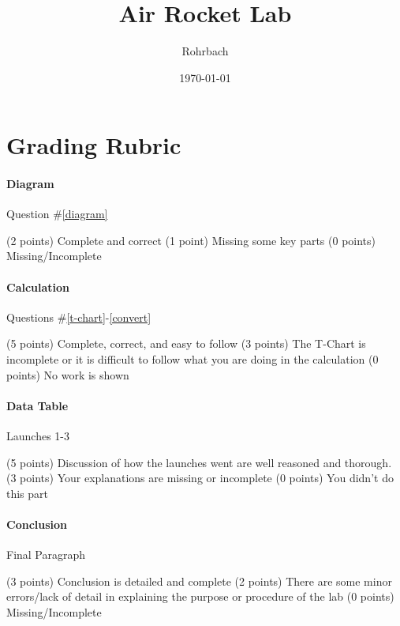 \documentclass[10pt]{exam}
\title{Air Rocket Lab}
\author{Rohrbach}
\date{\today}
\begin{document}
\maketitle


\section*{Grading Rubric}

  \paragraph{Diagram} Question \#\ref{diagram}
  \vspace{0.5em}
  \begin{checkboxes} \small
    \choice (2 points) Complete and correct 
    \choice (1 point) Missing some key parts
    \choice (0 points) Missing/Incomplete
  \end{checkboxes}


  \paragraph{Calculation} Questions \#\ref{t-chart}-\ref{convert}
  \vspace{0.5em}
  \begin{checkboxes} \small
    \choice (5 points) Complete, correct, and easy to follow 
    \choice (3 points) The T-Chart is incomplete or it is difficult to follow what you are doing in the calculation
    \choice (0 points) No work is shown
  \end{checkboxes}


  \paragraph{Data Table} Launches 1-3
  \vspace{0.5em}
  \begin{checkboxes} \small
    \choice (5 points) Discussion of how the launches went are well reasoned and thorough.
    \choice (3 points) Your explanations are missing or incomplete
    \choice (0 points) You didn't do this part
  \end{checkboxes}

  \paragraph{Conclusion} Final Paragraph
  \vspace{0.5em}
  \begin{checkboxes} \small
    \choice (3 points) Conclusion is detailed and complete
    \choice (2 points) There are some minor errors/lack of detail in explaining the purpose or procedure of the lab
    \choice (0 points) Missing/Incomplete
  \end{checkboxes}
\end{document}
